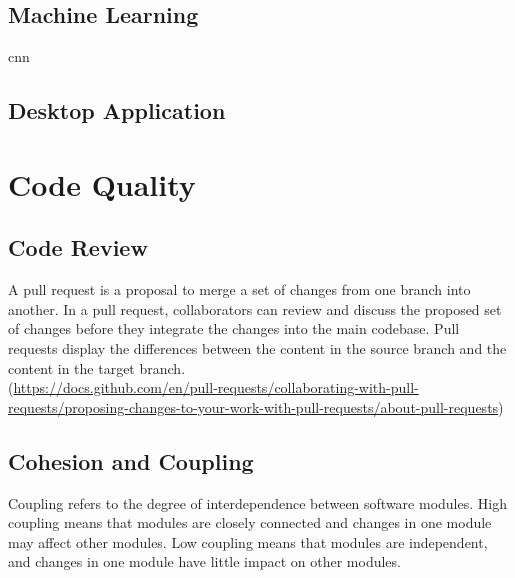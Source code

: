 \subsection{Machine Learning}

\gls{cnn}

\subsection{Desktop Application}


\section{Code Quality}

\subsection{Code Review}

A pull request is a proposal to merge a set of changes from one branch into another. In a pull request, collaborators can review and discuss the proposed set of changes before they integrate the changes into the main codebase. Pull requests display the differences between the content in the source branch and the content in the target branch. \\

(\url{https://docs.github.com/en/pull-requests/collaborating-with-pull-requests/proposing-changes-to-your-work-with-pull-requests/about-pull-requests})

\subsection{Cohesion and Coupling}

Coupling refers to the degree of interdependence between software modules. High coupling means that modules are closely connected and changes in one module may affect other modules. Low coupling means that modules are independent, and changes in one module have little impact on other modules. \\

